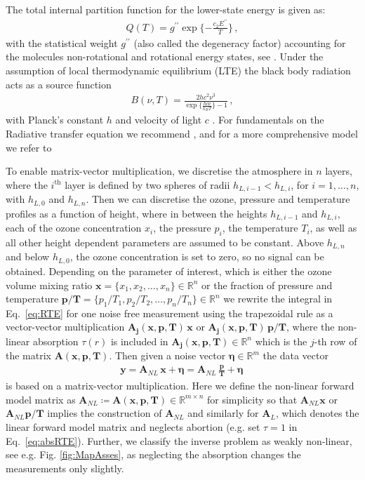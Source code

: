 The total internal partition function for the lower-state energy is given as:
\begin{align}
	Q(T )= g^{\prime \prime} \exp{\{ - \frac{ c_2 E^{\prime \prime} }{T}\}} \, ,
\end{align}
with the statistical weight $ g^{\prime \prime}$ (also called the degeneracy factor) accounting for the molecules non-rotational and rotational energy states, see \cite{vsimevckova2006einstein}.
Under the assumption of local thermodynamic equilibrium (LTE) the black body radiation acts as a source function
\begin{align}
	B(\nu,T)   = \frac{2 h c^2 \nu^3}{\exp{\{\frac{hc\nu}{k_B T}\}}-1}\, ,
\end{align}
with Planck's constant $h$ and velocity of light $c$ \cite{}.
For fundamentals on the Radiative transfer equation we recommend \cite[Chapter 1]{rybicki2000rte}, and for a more comprehensive model we refer to \cite{read2006forwardModel}

To enable matrix-vector multiplication, we discretise the atmosphere in $n$ layers, where the $i^\text{th}$ layer is defined by two spheres of radii $h_{L,i-1} < h_{L,i}$, for $i = 1, \dots, n$, with $h_{L,0}$ and $h_{L,n} $.
Then we can discretise the ozone, pressure and temperature profiles as a function of height, where in between the heights $h_{L,i-1}$ and $h_{L,i}$, each of the ozone concentration $x_{i}$, the pressure $p_{i}$, the temperature $T_{i}$, as well as all other height dependent parameters are assumed to be constant.
Above $h_{L, n}$ and below $h_{L,0} $, the ozone concentration is set to zero, so no signal can be obtained.
Depending on the parameter of interest, which is either the ozone volume mixing ratio $\bm{x} =\{x_1,x_2,\ldots,x_n\} \in \mathbb{R}^{n}$ or the fraction of pressure and temperature $\bm{p/T}= \{p_1/T_1,p_2/T_2,\ldots,p_n/T_n\} \in \mathbb{R}^{n} $
we rewrite the integral in Eq.~\eqref{eq:RTE} for one noise free measurement using the trapezoidal rule as a vector-vector multiplication $\bm{A_{j}}(\bm{x},  \bm{p},\bm{T}) \, \bm{x} $ or $\bm{A_{j}}(\bm{x},  \bm{p},\bm{T}) \, \bm{p}/ \bm{T} $, where the non-linear absorption $\tau(r)$ is included in $\bm{A_{j}}(\bm{x},  \bm{p},\bm{T}) \in \mathbb{R}^{n}$ which is the $j$-th row of the matrix $\bm{A}(\bm{x},  \bm{p},\bm{T})$.
Then given a noise vector $\bm{\eta} \in \mathbb{R}^{m}$ the data vector
\begin{align}
	\bm{y} = \bm{A}_{NL} \, \bm{x} + \bm{\eta}= \bm{A}_{NL} \,
	\frac{ \bm{p}}{\bm{T}} + \bm{\eta} \, 
\end{align}
is based on a matrix-vector multiplication.
Here we define the non-linear forward model matrix as $\bm{A}_{NL} \coloneqq \bm{A}(\bm{x},  \bm{p},\bm{T})   \in \mathbb{R}^{m \times n}$ for simplicity so that $\bm{A}_{NL}\bm{x}$ or $\bm{A}_{NL}\bm{p}/\bm{T}$ implies the construction of $\bm{A}_{NL}$ and similarly for $\bm{A}_L$, which denotes the linear forward model matrix and neglects abortion (e.g. set $\tau = 1$ in Eq.~\eqref{eq:absRTE}).
Further, we classify the inverse problem as weakly non-linear, see e.g. Fig. \ref{fig:MapAsses}, as neglecting the absorption changes the measurements only slightly.



